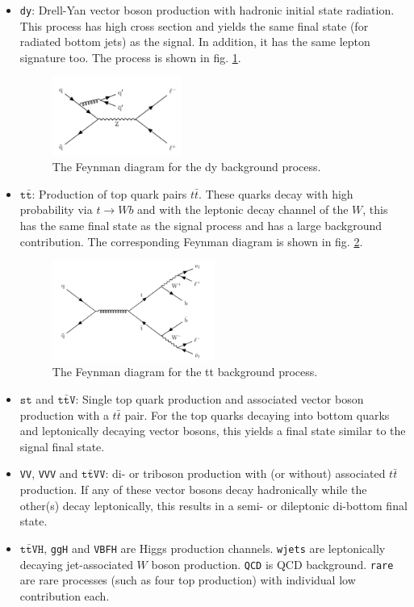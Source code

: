 \begin{itemize}
	\item[] \texttt{dy}: Drell-Yan vector boson production with hadronic initial state radiation. This process has high cross section and yields the same final state (for radiated bottom jets) as the signal. In addition, it has the same lepton signature too. The process is shown in fig. \ref{fig:dy_background}.
	\begin{figure}[h!]
		\centering
		\includegraphics[width=0.4\textwidth]{figures/analysis/dy.pdf}
		\caption{The Feynman diagram for the dy background process.}
		\label{fig:dy_background}
	\end{figure}
	\item[] $\texttt{t}\bar{\texttt{t}}$: Production of top quark pairs $t\bar{t}$. These quarks decay with high probability via $t\rightarrow Wb$ and with the leptonic decay channel of the $W$, this has the same final state as the signal process and has a large background contribution. The corresponding Feynman diagram is shown in fig. \ref{fig:tt_background}.
	\begin{figure}[h!]
		\centering
		\includegraphics[width=0.5\textwidth]{figures/analysis/tt.pdf}
		\caption{The Feynman diagram for the tt background process.}
		\label{fig:tt_background}
	\end{figure}
 	\item[] $\texttt{st}$ and $\texttt{t}\bar{\texttt{t}}\texttt{V}$: Single top quark production and associated vector boson production with a $t\bar{t}$ pair. For the top quarks decaying into bottom quarks and leptonically decaying vector bosons, this yields a final state similar to the signal final state.
	\item[] \texttt{VV}, \texttt{VVV} and $\texttt{t}{\bar{\texttt{t}}}\texttt{VV}$: di- or triboson production with (or without) associated $t\bar{t}$ production. If any of these vector bosons decay hadronically while the other(s) decay leptonically, this results in a semi- or dileptonic di-bottom final state.
	\item[] $\texttt{t}\bar{\texttt{t}}\texttt{VH}$, \texttt{ggH} and \texttt{VBFH} are Higgs production channels. \texttt{wjets} are leptonically decaying jet-associated $W$ boson production. \texttt{QCD} is QCD background. \texttt{rare} are rare processes (such as four top production) with individual low contribution each.
\end{itemize}

